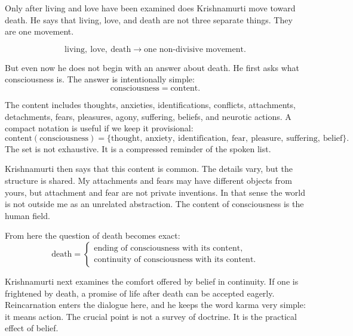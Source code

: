 Only after living and love have been examined does Krishnamurti move toward death. He says that living, love, and death are not three separate things. They are one movement.

\begin{equation}
\text{living},\ \text{love},\ \text{death}
   \longrightarrow
\text{one non-divisive movement}.
\end{equation}

But even now he does not begin with an answer about death. He first asks what consciousness is. The answer is intentionally simple:
\begin{equation}
\text{consciousness} = \text{content}.
\end{equation}

The content includes thoughts, anxieties, identifications, conflicts, attachments, detachments, fears, pleasures, agony, suffering, beliefs, and neurotic actions. A compact notation is useful if we keep it provisional:
\begin{equation}
\text{content}(\text{consciousness})
=
\{\text{thought},\ \text{anxiety},\ \text{identification},\ \text{fear},\ \text{pleasure},\ \text{suffering},\ \text{belief}\}.
\end{equation}
The set is not exhaustive. It is a compressed reminder of the spoken list.

Krishnamurti then says that this content is common. The details vary, but the structure is shared. My attachments and fears may have different objects from yours, but attachment and fear are not private inventions. In that sense the world is not outside me as an unrelated abstraction. The content of consciousness is the human field.

From here the question of death becomes exact:
\begin{equation}
\text{death}
=
\begin{cases}
\text{ending of consciousness with its content},\\
\text{continuity of consciousness with its content}.
\end{cases}
\end{equation}

Krishnamurti next examines the comfort offered by belief in continuity. If one is frightened by death, a promise of life after death can be accepted eagerly. Reincarnation enters the dialogue here, and he keeps the word karma very simple: it means action. The crucial point is not a survey of doctrine. It is the practical effect of belief.

